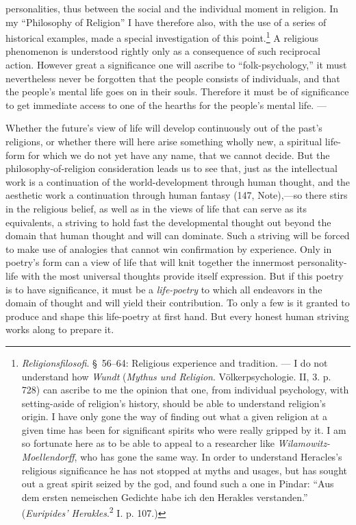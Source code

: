 \documentclass[12pt,a4paper]{book}
\newcommand{\opage}[1]{\marginnote{\footnotesize\textit{[#1]}}}
\begin{document}
personalities, thus between the social and the individual moment in religion. In my ``Philosophy of Religion'' I
have therefore also, with the use of a series of historical examples, made a special investigation of this
point.\footnote{\emph{Religionsfilosofi}. \S\ 56--64: Religious experience and tradition. --- I do not understand
how \emph{Wundt} (\emph{Mythus und Religion}. Völkerpsychologie. II, 3. p. 728) can ascribe to me the opinion
that one, from individual psychology, with setting-aside of religion's history, should be able to understand
religion's origin. I have only gone the way of finding out what a given religion at a given time has been for
significant spirits who were really gripped by it. I am so fortunate here as to be able to appeal to a researcher
like \emph{Wilamowitz-Moellendorff}, who has gone the same way. In order to understand Heracles's religious
significance he has not stopped at myths and usages, but has sought out a great spirit seized by the god, and
found such a one in Pindar: ``Aus dem ersten nemeischen Gedichte habe ich den Herakles verstanden.''
(\emph{Euripides' Herakles}.\textsuperscript{2} I. p. 107.)} A religious phenomenon is understood rightly only as
a consequence of such reciprocal action. However great a \opage{392}significance one will ascribe to ``folk-psychology,'' it
must nevertheless never be forgotten that the people consists of individuals, and that the people's mental life
goes on in their souls. Therefore it must be of significance to get immediate access to one of the hearths for
the people's mental life. ---

Whether the future's view of life will develop continuously out of the past's religions, or whether there will
here arise something wholly new, a spiritual life-form for which we do not yet have any name, that we cannot
decide. But the philosophy-of-religion consideration leads us to see that, just as the intellectual work is a
continuation of the world-development through human thought, and the aesthetic work a continuation through human
fantasy (147, Note),---so there stirs in the religious belief, as well as in the views of life that can serve as
its equivalents, a striving to hold fast the developmental thought out beyond the domain that human thought and
will can dominate. Such a striving will be forced to make use of analogies that cannot win confirmation by
experience. Only in poetry's form can a view of life that will knit together the innermost personality-life with
the most universal thoughts provide itself expression. But if this poetry is to have significance, it must be a
\emph{life-poetry} to which all endeavors in the domain of thought and will yield their contribution. To only a
few is it granted to produce and shape this life-poetry at first hand. But every honest human striving works
along to prepare it.
\end{document}
